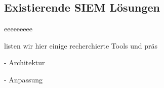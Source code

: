 \subsection{Existierende SIEM Lösungen}
eeeeeeeee

listen wir hier einige recherchierte Tools und präs






- Architektur %

- Anpassung %










